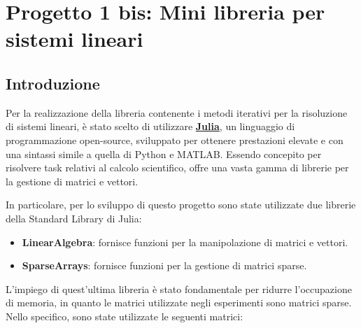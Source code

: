 \chapter{Progetto 1 bis: Mini libreria per sistemi lineari}
\section{Introduzione}\label{sec:intro}
Per la realizzazione della libreria contenente i metodi iterativi per la risoluzione
di sistemi lineari, è stato scelto di utilizzare \href{https://julialang.org/}{\textbf{Julia}},
un linguaggio di programmazione open-source, sviluppato per ottenere prestazioni
elevate e con una sintassi simile a quella di Python e MATLAB. Essendo concepito
per risolvere task relativi al calcolo scientifico, offre una vasta gamma di
librerie per la gestione di matrici e vettori.

In particolare, per lo sviluppo di questo progetto sono state utilizzate due
librerie della Standard Library di Julia:
\begin{itemize}
    \item \textbf{LinearAlgebra}: fornisce funzioni per la manipolazione di
          matrici e vettori.
    \item \textbf{SparseArrays}: fornisce funzioni per la gestione di matrici sparse.
\end{itemize}

L'impiego di quest'ultima libreria è stato fondamentale per ridurre l'occupazione
di memoria, in quanto le matrici utilizzate negli esperimenti sono matrici sparse.
Nello specifico, sono state utilizzate le seguenti matrici:
\begin{table}[!ht]
    \centering
\end{table}

